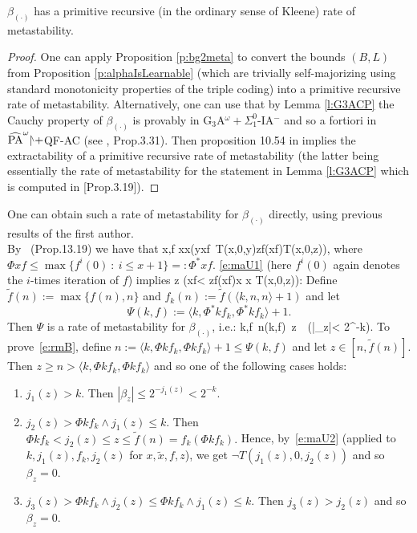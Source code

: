 \begin{cor} \label{metastability-alpha}
$\beta_{(\cdot)}$ has a primitive recursive (in the ordinary sense 
of Kleene) rate of metastability.
\end{cor}
\begin{proof} One can apply Proposition \ref{p:bg2meta} to convert 
the bounds $(B,L)$ from Proposition \ref{p:alphaIsLearnable} (which are 
trivially self-majorizing using standard monotonicity properties of the 
triple coding) into a primitive 
recursive rate of metastability. Alternatively, one can use that by 
Lemma \ref{l:G3ACP} the Cauchy property of $\beta_{(\cdot)}$ is provably in 
G$_3$A$^{\omega}+\Sigma^0_1$-IA$^-$ and so a fortiori  in 
$\widehat{\rm PA}^{\omega}\res+$QF-AC (see \cite{Kohlenbach08}, Prop.3.31).
Then proposition 10.54 in \cite{Kohlenbach08} implies the extractability 
of a primitive recursive rate of metastability (the latter being essentially 
the rate of metastability for the statement in Lemma \ref{l:G3ACP} 
which is computed in \cite{Kohlenbach08}[Prop.3.19]).
\end{proof} 

\begin{rmk}\label{r:metaB}
One can obtain such a rate of metastability for $\beta_{(\cdot)}$ directly, using previous results
of the first author.\\
By~\cite{Kohlenbach08} (Prop.13.19) we have that
\be[e:maU1]
\forall x,f \forall \tilde x\leq x\big(\exists y\leq\Phi xf\ T(\tilde x,0,y)\vee \forall z\leq f(\Phi xf)\neg T(\tilde x,0,z)\big),
\ee
where $\Phi xf\leq \max\{f^{i}(0)\ 
:\ i\leq x+1\}=:\Phi^*xf$. \eqref{e:maU1} (here $f^i(0)$ again denotes the 
$i$-times iteration of $f$) implies
\be[e:maU2]
\forall z \big(\Phi xf< z\leq f(\Phi xf)\rightarrow \forall \tilde x \leq x \neg T(\tilde x,0,z)\big):
\ee
Define $\tilde f(n):=\max\{f(n),n\}$ and $f_k(n):=\tilde f(\langle k,n,n\rangle+1)$ and let
\[
\Psi(k,f):=\langle k,\Phi^*kf_k,\Phi^*kf_k\rangle + 1.
\]
Then $\Psi$ is a rate of metastability for $\beta_{(\cdot)}$, i.e.:
\be[e:rmB]
\forall k,f\ \exists n\leq \Psi(k,f)\ \forall z\in[n,\tilde f(n)]\ \ 
(|\beta_z|< 2^{-k}).
\ee
To prove~\eqref{e:rmB}, define $n:=\langle k, \Phi kf_k, \Phi kf_k\rangle+1\leq\Psi(k,f)$ and let $z\in[n,\tilde f(n)]$. Then 
$z\geq n > \langle k, \Phi kf_k, \Phi kf_k\rangle$ and so one of the following cases holds:
\hspace{35mm}\begin{enumerate}
\item $j_1(z)>k$. Then $|\beta_z|\leq2^{-j_1(z)}<2^{-k}$.
\item $j_2(z)>\Phi kf_k\wedge j_1(z)\leq k$. Then 
$
\Phi kf_k < j_2(z)\leq z \leq \tilde f(n)=f_k(\Phi kf_k).
$
Hence, by~\eqref{e:maU2} (applied to $k,j_1(z),f_k,j_2(z)$ 
for $x, \tilde{x}, f, z$), we get 
$\neg T(j_1(z),0,j_2(z))$ and so $\beta_z=0$.
\item $j_3(z)>\Phi kf_k\wedge j_2(z)\leq\Phi kf_k\wedge j_1(z)\leq k$. Then $j_3(z)>j_2(z)$ and so $\beta_z=0$.
\end{enumerate}
\end{rmk}


